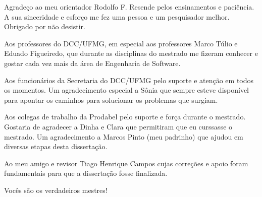 Agradeço ao meu orientador Rodolfo F. Resende pelos ensinamentos e paciência. A
sua sinceridade e esforço me fez uma pessoa e um pesquisador melhor. Obrigado
por não desistir.

Aos professores do DCC/UFMG, em especial aos professores Marco Túlio e Eduado
Figueiredo, que durante as disciplinas do mestrado me fizeram conhecer e gostar
cada vez mais da área de Engenharia de Software.

Aos funcionários da Secretaria do DCC/UFMG pelo suporte e atenção em todos os
momentos. Um agradecimento especial a Sônia  que sempre esteve disponível para
apontar os caminhos para solucionar os problemas que surgiam.

Aos colegas de trabalho da Prodabel pelo suporte e força durante o mestrado.
Gostaria de agradecer a Dinha e Clara que permitiram que eu curssasse o
mestrado. Um agradecimento a Marcos Pinto (meu padrinho) que ajudou em diversas
etapas desta dissertação.

Ao meu amigo e revisor Tiago Henrique Campos cujas correções e apoio foram
fundamentais para que a dissertação fosse finalizada.

Vocês são os verdadeiros mestres!
